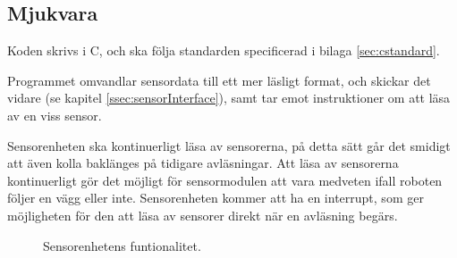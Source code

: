 \documentclass[a4paper,11pt]{article}
\begin{document}
\begin{HardwareList}
\end{HardwareList}

\subsection{Mjukvara}

Koden skrivs i C, och ska följa standarden specificerad i bilaga \ref{sec:cstandard}.

Programmet omvandlar sensordata till ett mer läsligt format, och skickar det vidare (se kapitel \ref{ssec:sensorInterface}), samt tar emot instruktioner om att läsa av en viss sensor. 

Sensorenheten ska kontinuerligt läsa av sensorerna, på detta sätt går det smidigt att även kolla baklänges på tidigare avläsningar. Att läsa av sensorerna kontinuerligt gör det möjligt för sensormodulen att vara medveten ifall roboten följer en vägg eller inte. Sensorenheten kommer att ha en interrupt, som ger möjligheten för den att läsa av sensorer direkt när en avläsning begärs.

\begin{figure}[h!]
	\caption{Sensorenhetens funtionalitet.}
	\label{fig:unitSensorFunktion}
\end{figure}
\end{document}
